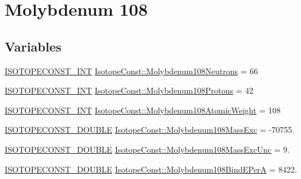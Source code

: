 \hypertarget{group___isotope_const-_molybdenum-_mo108}{}\section{Molybdenum 108}
\label{group___isotope_const-_molybdenum-_mo108}
\subsection*{Variables}
\begin{DoxyCompactItemize}
\item 
\mbox{\hyperlink{group___isotope_const-_macros_ga5f18360b3e99483a35c32d789e62621c}{I\+S\+O\+T\+O\+P\+E\+C\+O\+N\+S\+T\+\_\+\+I\+NT}} \mbox{\hyperlink{group___isotope_const-_molybdenum-_mo108_ga7e59fb8c1f44f68a0ad56f3521dc47fd}{Isotope\+Const\+::\+Molybdenum108\+Neutrons}} = 66
\item 
\mbox{\hyperlink{group___isotope_const-_macros_ga5f18360b3e99483a35c32d789e62621c}{I\+S\+O\+T\+O\+P\+E\+C\+O\+N\+S\+T\+\_\+\+I\+NT}} \mbox{\hyperlink{group___isotope_const-_molybdenum-_mo108_gaaced3d163b1aecd0ae4f9b3dd7eb14c1}{Isotope\+Const\+::\+Molybdenum108\+Protons}} = 42
\item 
\mbox{\hyperlink{group___isotope_const-_macros_ga5f18360b3e99483a35c32d789e62621c}{I\+S\+O\+T\+O\+P\+E\+C\+O\+N\+S\+T\+\_\+\+I\+NT}} \mbox{\hyperlink{group___isotope_const-_molybdenum-_mo108_gaff8c2f0f6b2ec1d5669b6b27a87c7a00}{Isotope\+Const\+::\+Molybdenum108\+Atomic\+Weight}} = 108
\item 
\mbox{\hyperlink{group___isotope_const-_macros_ga8f45a7272ce02c0b4c65c44636ed719a}{I\+S\+O\+T\+O\+P\+E\+C\+O\+N\+S\+T\+\_\+\+D\+O\+U\+B\+LE}} \mbox{\hyperlink{group___isotope_const-_molybdenum-_mo108_ga459b37a93416fe0d8f5d07a21b317c91}{Isotope\+Const\+::\+Molybdenum108\+Mass\+Exc}} = -\/70755.
\item 
\mbox{\hyperlink{group___isotope_const-_macros_ga8f45a7272ce02c0b4c65c44636ed719a}{I\+S\+O\+T\+O\+P\+E\+C\+O\+N\+S\+T\+\_\+\+D\+O\+U\+B\+LE}} \mbox{\hyperlink{group___isotope_const-_molybdenum-_mo108_ga3b3971d04b40060cb8261c6fed556353}{Isotope\+Const\+::\+Molybdenum108\+Mass\+Exc\+Unc}} = 9.
\item 
\mbox{\hyperlink{group___isotope_const-_macros_ga8f45a7272ce02c0b4c65c44636ed719a}{I\+S\+O\+T\+O\+P\+E\+C\+O\+N\+S\+T\+\_\+\+D\+O\+U\+B\+LE}} \mbox{\hyperlink{group___isotope_const-_molybdenum-_mo108_ga588a571d8d1a967a67614e2caf05006c}{Isotope\+Const\+::\+Molybdenum108\+Bind\+E\+PerA}} = 8422.

\end{DoxyCompactItemize}
